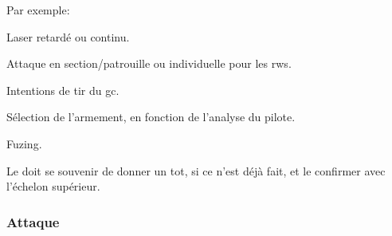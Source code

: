 \begin{e1}
\begin{e2}
		Par exemple:
		
		\begin{e3}
			
			\item Laser retardé ou continu.
			\item Attaque en section/patrouille ou individuelle pour les \glspl{rw}.
			\item Intentions de tir du \gls{gc}.
			\item Sélection de l'armement, en fonction de l'analyse du pilote.
			\item Fuzing.
			
		\end{e3}
		
		\item Le \ja{} doit se souvenir de donner un \gls{tot}, si ce n'est déjà fait, et le confirmer avec l'échelon supérieur.
		
	\end{e2}
	
\end{e1}
	
\subsubsection{Attaque}%

